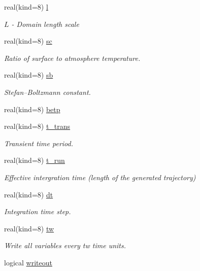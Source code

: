 \begin{DoxyCompactItemize}
real(kind=8) \hyperlink{namespaceparams_aa2b032a17c85d2069ca59212ad8309a1}{l}
\begin{DoxyCompactList}\small\item\em $L$ -\/ Domain length scale \end{DoxyCompactList}\item 
real(kind=8) \hyperlink{namespaceparams_a35c130eb539b9df8c52cc02427913cc0}{sc}
\begin{DoxyCompactList}\small\item\em Ratio of surface to atmosphere temperature. \end{DoxyCompactList}\item 
real(kind=8) \hyperlink{namespaceparams_a7e4a380117958612bc5cf4cac910b483}{sb}
\begin{DoxyCompactList}\small\item\em Stefan–\+Boltzmann constant. \end{DoxyCompactList}\item 
real(kind=8) \hyperlink{namespaceparams_a9ffe87bb8aaab8a0d4f8d5f644b98785}{betp}
\item 
real(kind=8) \hyperlink{namespaceparams_aabf0943afa2272a8bbbd58c49ad0db38}{t\+\_\+trans}
\begin{DoxyCompactList}\small\item\em Transient time period. \end{DoxyCompactList}\item 
real(kind=8) \hyperlink{namespaceparams_a923cab407956c82921069b7ec0e69eb9}{t\+\_\+run}
\begin{DoxyCompactList}\small\item\em Effective intergration time (length of the generated trajectory) \end{DoxyCompactList}\item 
real(kind=8) \hyperlink{namespaceparams_a2d658dc74d6a45a2e71b06bde97df084}{dt}
\begin{DoxyCompactList}\small\item\em Integration time step. \end{DoxyCompactList}\item 
real(kind=8) \hyperlink{namespaceparams_a0955c0296092bb15d2dcd120d72ad479}{tw}
\begin{DoxyCompactList}\small\item\em Write all variables every tw time units. \end{DoxyCompactList}\item 
logical \hyperlink{namespaceparams_affc7b423a975c0e92b62e67ed04edea5}{writeout}

\end{DoxyCompactItemize}
